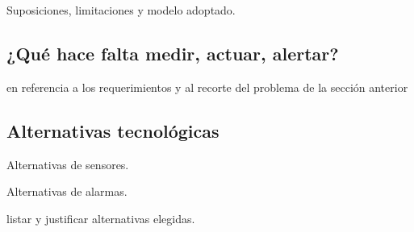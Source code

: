 Suposiciones, limitaciones y modelo adoptado.


\subsection{¿Qué hace falta medir, actuar, alertar?}

en referencia a los requerimientos y al recorte del problema de la sección anterior


\subsection{Alternativas tecnológicas}

Alternativas de sensores.
%
%
%

Alternativas de alarmas.

listar y justificar alternativas elegidas.